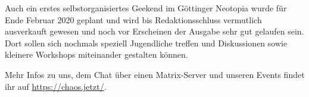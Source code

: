 \begin{DSarticle}[
    title={chaos.jetzt},
    author=ruru4143, email=ruru-chaosjetzt-dsartikel@r3.at,
    head=chaos.jetzt,
    tocentry=chaos.jetzt,
]
Auch ein erstes selbstorganisiertes Geekend im Göttinger Neotopia wurde für Ende Februar 2020 geplant und wird bis Redaktionsschluss vermutlich ausverkauft gewesen und noch vor Erscheinen der Ausgabe sehr gut gelaufen sein.
Dort sollen sich nochmals speziell Jugendliche treffen und Diskussionen sowie kleinere Workshops miteinander gestalten können.

Mehr Infos zu uns, dem Chat über einen Matrix-Server und unseren Events findet ihr auf \url{https://chaos.jetzt/}.





\end{DSarticle}

